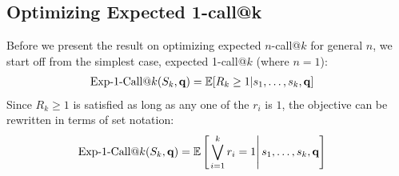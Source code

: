 \subsection{Optimizing Expected 1-call@k}
Before we present the result on optimizing expected $n$-call@$k$ for
general $n$, we start off from the simplest case, expected 1-call@$k$
(where $n=1$):
\begin{align}
    \ExpOneCall(S_k,\vec{q}) & = \mathbb{E}[R_k\geq 1|s_1,\dots,s_k,\vec{q}]
\end{align}
Since $R_k\geq 1$ is satisfied as long as any one of the $r_i$ is $1$,
the objective can be rewritten in terms of set notation:
\begin{align}
\label{eq:setRelevance}
    \ExpOneCall(S_k,\vec{q}) & = \mathbb{E} \left[\left. \bigvee_{i=1}^{k}r_i=1 \right| s_{1},\dots, s_{k},\vec{q} \right]
\end{align}

